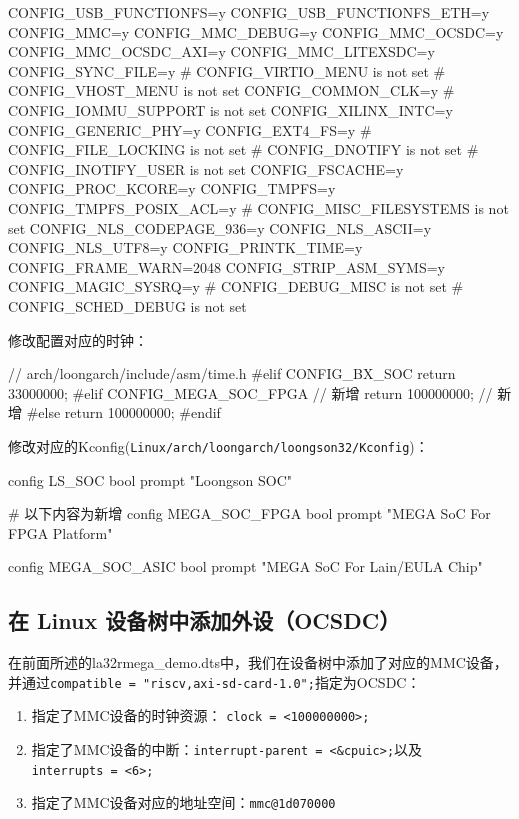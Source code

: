 \begin{CodeBlock}[language=BookConfig]
CONFIG_USB_FUNCTIONFS=y
CONFIG_USB_FUNCTIONFS_ETH=y
CONFIG_MMC=y
CONFIG_MMC_DEBUG=y
CONFIG_MMC_OCSDC=y
CONFIG_MMC_OCSDC_AXI=y
CONFIG_MMC_LITEXSDC=y
CONFIG_SYNC_FILE=y
# CONFIG_VIRTIO_MENU is not set
# CONFIG_VHOST_MENU is not set
CONFIG_COMMON_CLK=y
# CONFIG_IOMMU_SUPPORT is not set
CONFIG_XILINX_INTC=y
CONFIG_GENERIC_PHY=y
CONFIG_EXT4_FS=y
# CONFIG_FILE_LOCKING is not set
# CONFIG_DNOTIFY is not set
# CONFIG_INOTIFY_USER is not set
CONFIG_FSCACHE=y
CONFIG_PROC_KCORE=y
CONFIG_TMPFS=y
CONFIG_TMPFS_POSIX_ACL=y
# CONFIG_MISC_FILESYSTEMS is not set
CONFIG_NLS_CODEPAGE_936=y
CONFIG_NLS_ASCII=y
CONFIG_NLS_UTF8=y
CONFIG_PRINTK_TIME=y
CONFIG_FRAME_WARN=2048
CONFIG_STRIP_ASM_SYMS=y
CONFIG_MAGIC_SYSRQ=y
# CONFIG_DEBUG_MISC is not set
# CONFIG_SCHED_DEBUG is not set
\end{CodeBlock}

修改配置对应的时钟：

\begin{CodeBlock}[language=BookC]
// arch/loongarch/include/asm/time.h
#elif CONFIG_BX_SOC
	return 33000000;
#elif CONFIG_MEGA_SOC_FPGA // 新增
	return 100000000; // 新增
#else
	return 100000000;
#endif
\end{CodeBlock}

修改对应的Kconfig(\texttt{Linux/arch/loongarch/loongson32/Kconfig})：

\begin{CodeBlock}[language=BookConfig]
config LS_SOC
	bool
	prompt "Loongson SOC"

# 以下内容为新增
config MEGA_SOC_FPGA
	bool
	prompt "MEGA SoC For FPGA Platform"

config MEGA_SOC_ASIC
	bool
	prompt "MEGA SoC For Lain/EULA Chip"
\end{CodeBlock}

\subsection{在 Linux 设备树中添加外设（OCSDC）}\label{sec:07-soc-and-system-006}

在前面所述的la32rmega\_demo.dts中，我们在设备树中添加了对应的MMC设备，并通过\texttt{compatible\ =\ "riscv,axi-sd-card-1.0";}指定为OCSDC：

\begin{enumerate}
\def\labelenumi{\arabic{enumi}.}
\item
  指定了MMC设备的时钟资源： \texttt{clock\ =\ \textless{}100000000\textgreater{};}
\item
  指定了MMC设备的中断：\texttt{interrupt-parent\ =\ \textless{}\&cpuic\textgreater{};}以及\texttt{interrupts\ =\ \textless{}6\textgreater{};}
\item
  指定了MMC设备对应的地址空间：\texttt{mmc@1d070000}
\end{enumerate}

